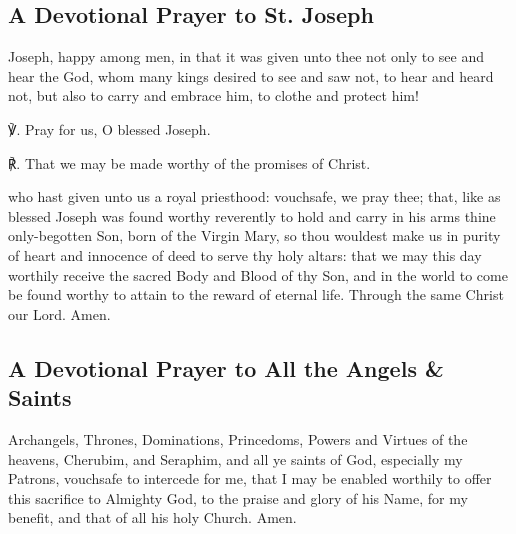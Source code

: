 \subsection{A Devotional Prayer to St. Joseph}
 Joseph, happy among men, in that it was given unto thee not only to see and hear the God, whom many kings desired to see and saw not, to hear and heard not, but also to carry and embrace him, to clothe and protect him!

℣. Pray for us, O blessed Joseph.

℟. That we may be made worthy of the promises of Christ.

{} who hast given unto us a royal priesthood: vouchsafe, we pray thee; that, like as blessed Joseph was found worthy reverently to hold and carry in his arms thine only-begotten Son, born of the Virgin Mary, so thou wouldest make us in purity of heart and innocence of deed to serve thy holy altars: that we may this day worthily receive the sacred Body and Blood of thy Son, and in the world to come be found worthy to attain to the reward of eternal life. Through the same Christ our Lord. Amen.


\subsection{A Devotional Prayer to All the Angels \& Saints}
 Archangels, Thrones, Dominations, Princedoms, Powers and Virtues of the heavens, Cherubim, and Seraphim, and all ye saints of God, especially my Patrons, vouchsafe to intercede for me, that I may be enabled worthily to offer this sacrifice to Almighty God, to the praise and glory of his Name, for my benefit, and that of all his holy Church. Amen.


